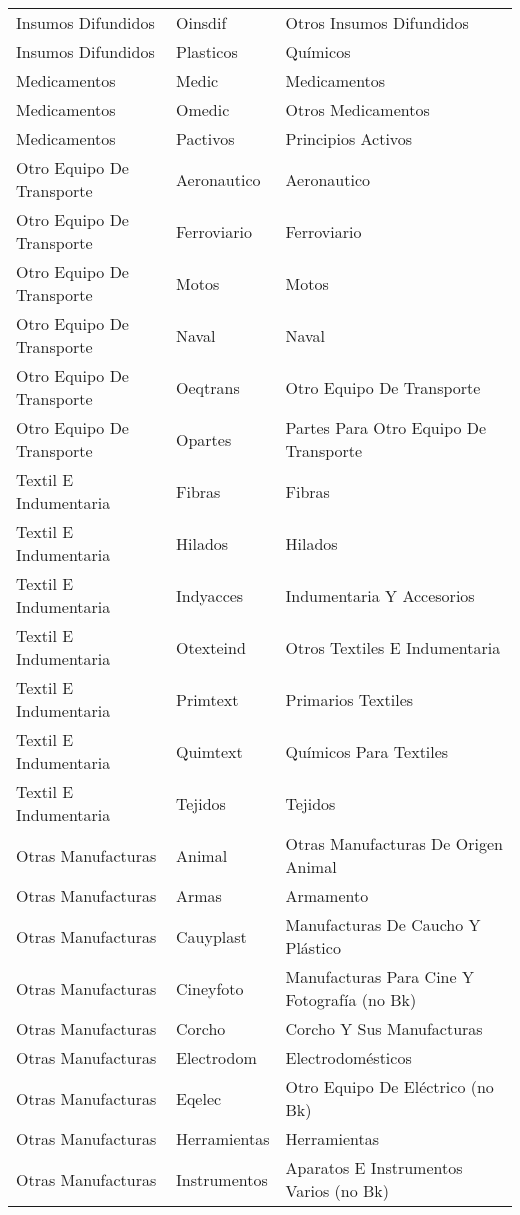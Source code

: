 \documentclass[class=article, crop=false]{standalone}
\begin{document}
\begin{longtable}[!ht]{lll}
	Insumos Difundidos & Oinsdif & Otros Insumos Difundidos \\
	Insumos Difundidos & Plasticos & Químicos \\
	Medicamentos & Medic & Medicamentos \\
	Medicamentos & Omedic & Otros Medicamentos \\
	Medicamentos & Pactivos & Principios Activos \\
	Otro Equipo De Transporte & Aeronautico & Aeronautico \\
	Otro Equipo De Transporte & Ferroviario & Ferroviario \\
	Otro Equipo De Transporte & Motos & Motos \\
	Otro Equipo De Transporte & Naval & Naval \\
	Otro Equipo De Transporte & Oeqtrans & Otro Equipo De Transporte \\
	Otro Equipo De Transporte & Opartes & Partes Para Otro Equipo De Transporte \\
	Textil E Indumentaria & Fibras & Fibras \\
	Textil E Indumentaria & Hilados & Hilados \\
	Textil E Indumentaria & Indyacces & Indumentaria Y Accesorios \\
	Textil E Indumentaria & Otexteind & Otros Textiles E Indumentaria \\
	Textil E Indumentaria & Primtext & Primarios Textiles \\
	Textil E Indumentaria & Quimtext & Químicos Para Textiles \\
	Textil E Indumentaria & Tejidos & Tejidos \\
	Otras Manufacturas & Animal & Otras Manufacturas De Origen Animal \\
	Otras Manufacturas & Armas & Armamento \\
	Otras Manufacturas & Cauyplast & Manufacturas De Caucho Y Plástico \\
	Otras Manufacturas & Cineyfoto & Manufacturas Para Cine Y Fotografía (no Bk) \\
	Otras Manufacturas & Corcho & Corcho Y Sus Manufacturas \\
	Otras Manufacturas & Electrodom & Electrodomésticos \\
	Otras Manufacturas & Eqelec & Otro Equipo De Eléctrico (no Bk) \\
	Otras Manufacturas & Herramientas & Herramientas \\
	Otras Manufacturas & Instrumentos & Aparatos E Instrumentos Varios (no Bk) \\

\end{longtable}
\end{document}
